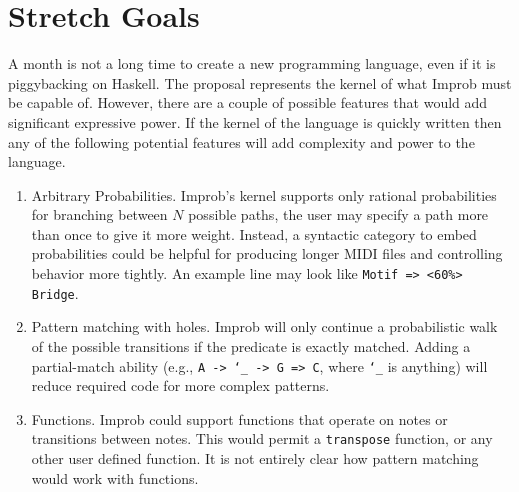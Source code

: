 \documentclass{article}
\begin{document}
\section{Stretch Goals}
A month is not a long time to create a new programming language, even if it is piggybacking on Haskell. The proposal represents the kernel of what Improb must be capable of. However, there are a couple of possible features that would add significant expressive power. If the kernel of the language is quickly written then any of the following potential features will add complexity and power to the language.
\begin{enumerate}
    \item Arbitrary Probabilities. Improb's kernel supports only rational probabilities for branching between $N$ possible paths, the user may specify a path more than once to give it more weight. Instead, a syntactic category to embed probabilities could be helpful for producing longer MIDI files and controlling behavior more tightly. An example line may look like \texttt{Motif => <60\%> Bridge}.
    \item Pattern matching with holes. Improb will only continue a probabilistic walk of the possible transitions if the predicate is exactly matched. Adding a partial-match ability (e.g., \texttt{A -> \char`_ -> G => C}, where \texttt{\char`_} is anything) will reduce required code for more complex patterns.

    \item Functions. Improb could support functions that operate on notes or transitions between notes. This would permit a \texttt{transpose} function, or any other user defined function. It is not entirely clear how pattern matching would work with functions.
\end{enumerate}
\end{document}
